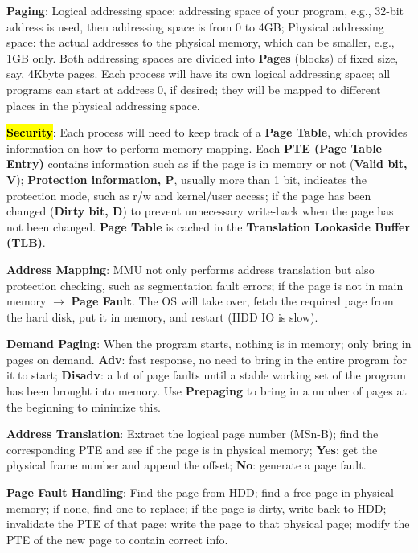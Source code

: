 \documentclass[a4paper]{article}
\begin{document}
\begin{multicols*}{2}
  \textbf{Paging}: Logical addressing space: addressing space of your program, e.g., 32-bit address is used, then addressing space is from 0 to 4GB; Physical addressing space: the actual addresses to the physical memory, which can be smaller, e.g., 1GB only. Both addressing spaces are divided into \textbf{Pages} (blocks) of fixed size, say, 4Kbyte pages. Each process will have its own logical addressing space; all programs can start at address 0, if desired; they will be mapped to different places in the physical addressing space.

  \hl{\textbf{Security}}: Each process will need to keep track of a \textbf{Page Table}, which provides information on how to perform memory mapping. Each \textbf{PTE (Page Table Entry)} contains information such as if the page is in memory or not (\textbf{Valid bit, V}); \textbf{Protection information, P}, usually more than 1 bit, indicates the protection mode, such as r/w and kernel/user access; if the page has been changed (\textbf{Dirty bit, D}) to prevent unnecessary write-back when the page has not been changed. \textbf{Page Table} is cached in the \textbf{Translation Lookaside Buffer (TLB)}.

  \textbf{Address Mapping}: MMU not only performs address translation but also protection checking, such as segmentation fault errors; if the page is not in main memory $\to$ \textbf{Page Fault}. The OS will take over, fetch the required page from the hard disk, put it in memory, and restart (HDD IO is slow).

  \textbf{Demand Paging}: When the program starts, nothing is in memory; only bring in pages on demand. \textbf{Adv}: fast response, no need to bring in the entire program for it to start; \textbf{Disadv}: a lot of page faults until a stable working set of the program has been brought into memory. Use \textbf{Prepaging} to bring in a number of pages at the beginning to minimize this.


  \textbf{Address Translation}: Extract the logical page number (MSn-B); find the corresponding PTE and see if the page is in physical memory; \textbf{Yes}: get the physical frame number and append the offset; \textbf{No}: generate a page fault.

  \textbf{Page Fault Handling}: Find the page from HDD; find a free page in physical memory; if none, find one to replace; if the page is dirty, write back to HDD; invalidate the PTE of that page; write the page to that physical page; modify the PTE of the new page to contain correct info.


\end{multicols*}
\end{document}
